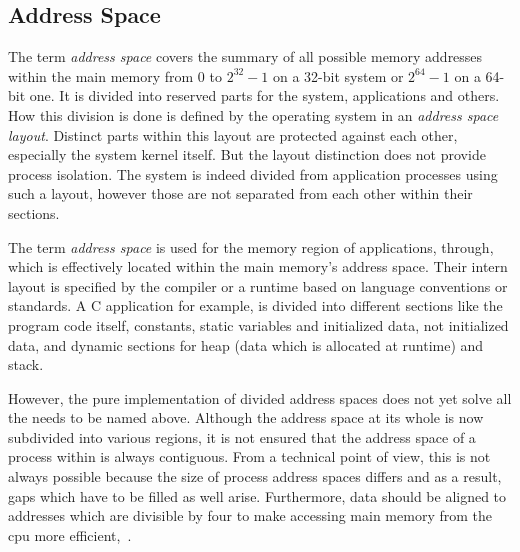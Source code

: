 \subsection{Address Space}
The term \textit{address space} covers the summary of all possible memory addresses within the main memory from 0 to $2^{32}-1$ on a 32-bit system or $2^{64}-1$ on a 64-bit one. 
It is divided into reserved parts for the system, applications and others.
How this division is done is defined by the operating system in an \textit{address space layout}\cite{mandl2014Grundkurs}.
Distinct parts within this layout are protected against each other, especially the system kernel itself\cite{brause2017betriebssysteme}.
But the layout distinction does not provide process isolation. 
The system is indeed divided from application processes using such a layout, however those are not separated from each other within their sections\cite{mandl2014Grundkurs}.

The term \textit{address space} is used for the memory region of applications, through, which is effectively located within the main memory's address space.
Their intern layout is specified by the compiler or a runtime based on language conventions or standards.
A C application for example, is divided into different sections like the program code itself, constants, static variables and initialized data, not initialized data, and dynamic sections for heap (data which is allocated at runtime) and stack\cite{mandl2014Grundkurs}.

However, the pure implementation of divided address spaces does not yet solve all the needs to be named above.
Although the address space at its whole is now subdivided into various regions, it is not ensured that the address space of a process within is always contiguous.
From a technical point of view, this is not always possible because the size of process address spaces differs and as a result, gaps which have to be filled as well arise\cite{mandl2014Grundkurs}.
Furthermore, data should be aligned to addresses which are divisible by four to make accessing main memory from the \ac{cpu} more efficient\cite{mandl2014Grundkurs},~\cite{brause2017betriebssysteme}.
%
%
 
